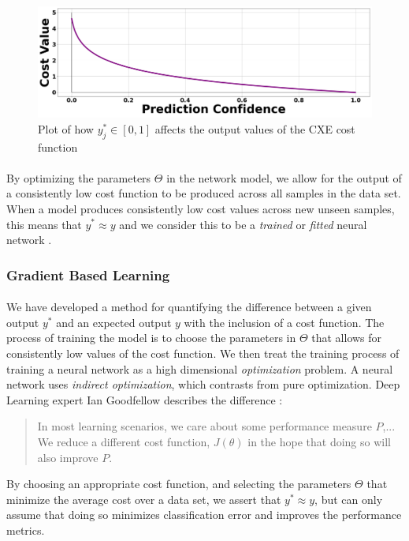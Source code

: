 \documentclass[12pt,letterpaper]{article}
\begin{document}
\begin{figure}[H]
\begin{center}
\includegraphics[scale=0.25]{../Figures/CXELoss}
\end{center}
\caption{Plot of how $y^*_{j} \in [0,1]$ affects the output values of the CXE cost function}
\label{fig-CXELoss}
\end{figure}

\paragraph*{}By optimizing the parameters $\Theta$ in the network model, we allow for the output of a consistently low cost function to be produced across all samples in the data set. When a model produces consistently low cost values across new unseen samples, this means that $y^* \approx y$ and we consider this to be a \textit{trained} or \textit{fitted} neural network \cite{Goodfellow,Loy,Mitchell}.


\subsubsection{Gradient Based Learning}

\paragraph*{}We have developed a method for quantifying the difference between a given output $y^*$ and an expected output $y$ with the inclusion of a cost function. The process of training the model is to choose the parameters in $\Theta$ that allows for consistently low values of the cost function. We then treat the training process of training a neural network as a high dimensional \textit{optimization} problem. A neural network uses \textit{indirect optimization}, which contrasts from pure optimization. Deep Learning expert Ian Goodfellow describes the difference \cite{Goodfellow}:
\begin{quote}
In most learning scenarios, we care about some performance measure $P$,... We reduce a different cost function, $J(\theta)$ in the hope that doing so will also improve $P$.
\end{quote}
By choosing an appropriate cost function, and selecting the parameters $\Theta$ that minimize the average cost over a data set, we assert that $y^* \approx y$, but can only assume that doing so minimizes classification error and improves the performance metrics.
\end{document}
